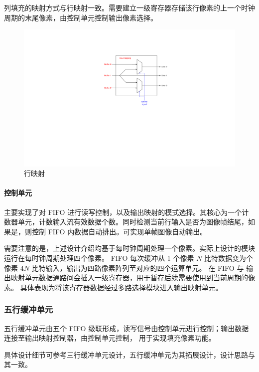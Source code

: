 \documentclass[12pt, a4paper, oneside]{ctexbook}
\begin{document}
	列填充的映射方式与行映射一致。需要建立一级寄存器存储该行像素的上一个时钟周期的末尾像素，由控制单元控制输出像素选择。
	\begin{figure}[h]
		\centering
		\includegraphics[scale=1]{pic/row_mapping.pdf}
		\caption{行映射}
	\end{figure}	
	\paragraph{控制单元}
	主要实现了对 FIFO 进行读写控制，以及输出映射的模式选择。其核心为一个计数器单元，计数输入流有效数据个数。同时检测当前行输入是否为图像帧结尾，如果是，则控制 FIFO 内数据自动排出。可实现单帧图像自动输出。
	\par 需要注意的是，上述设计介绍均基于每时钟周期处理一个像素。实际上设计的模块运行在每时钟周期处理四个像素。
	FIFO 每次缓冲从 1 个像素 $N$ 比特数据变为个像素 $4N$ 比特输入，输出为四路像素阵列至对应的四个运算单元。
	在 FIFO 与 输出映射单元数据通路间会插入一级寄存器，用于暂存后续需要使用到当前周期的像素。
	具体表现为将该寄存器数据经过多路选择模块进入输出映射单元。
	\subsubsection{五行缓冲单元}
	五行缓冲单元由五个 FIFO 级联形成，读写信号由控制单元进行控制；输出数据连接至输出映射控制器，由控制单元控制，
	用于实现填充像素功能。\par 具体设计细节可参考三行缓冲单元设计，五行缓冲单元为其拓展设计，设计思路与其一致。
	
\end{document}
